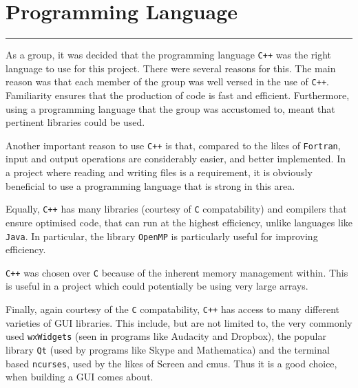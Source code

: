 \section{Programming Language}
\vspace{-2em}\rule{\textwidth}{1pt}\vspace{1em}

As a group, it was decided that the programming language \texttt{C++} was the right language to use for this project.
There were several reasons for this.
The main reason was that each member of the group was well versed in the use of \texttt{C++}.
Familiarity ensures that the production of code is fast and efficient.
Furthermore, using a programming language that the group was accustomed to, meant that pertinent libraries could be used.

Another important reason to use \texttt{C++} is that, compared to the likes of \texttt{Fortran}, input and output operations are considerably easier, and better implemented.
In a project where reading and writing files is a requirement, it is obviously beneficial to use a programming language that is strong in this area.

Equally, \texttt{C++} has many libraries (courtesy of \texttt{C} compatability) and compilers that ensure optimised code, that can run at the highest efficiency, unlike languages like \texttt{Java}.
In particular, the library \texttt{OpenMP} is particularly useful for improving efficiency.

\texttt{C++} was chosen over \texttt{C} because of the inherent memory management within.
This is useful in a project which could potentially be using very large arrays.

Finally, again courtesy of the \texttt{C} compatability, \texttt{C++} has access to many different varieties of GUI libraries.
This include, but are not limited to, the very commonly used \texttt{wxWidgets} (seen in programs like Audacity and Dropbox), the popular library \texttt{Qt} (used by programs like Skype and Mathematica) and the terminal based \texttt{ncurses}, used by the likes of Screen and cmus.
Thus it is a good choice, when building a GUI comes about.
